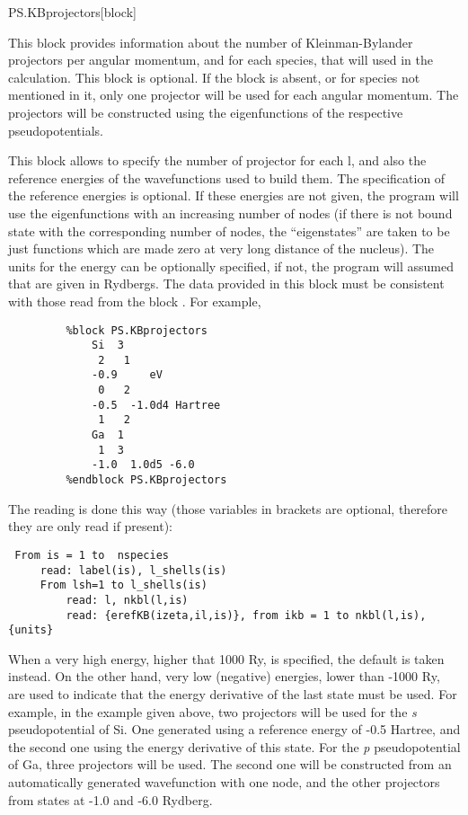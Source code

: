\begin{fdfentry}{PS.KBprojectors}[block]

This block provides information about the number of Kleinman-Bylander
projectors per angular momentum, and for each species, that will used
in the calculation. This block is optional.
If the block is absent, or for species not mentioned in it, only
one projector will be used for each angular momentum. The projectors
will be constructed using the eigenfunctions of the respective
pseudopotentials.


This block allows to specify the number of projector for each l, and also
the reference energies of the wavefunctions used to build them.
The specification of the reference energies is optional. If these
energies are not given, the program will use the eigenfunctions with an
increasing number of nodes (if there is not bound state with
the corresponding number of nodes, the ``eigenstates'' are taken to be just
functions which are made zero at very long distance of the nucleus).
The units for the energy can be optionally specified, if not, the
program will assumed that are given in Rydbergs.
The data provided in this block must be consistent with those
read from the block . For example,

\begin{verbatim}
         %block PS.KBprojectors
             Si  3
              2   1
             -0.9     eV
              0   2
             -0.5  -1.0d4 Hartree
              1   2
             Ga  1
              1  3
             -1.0  1.0d5 -6.0
         %endblock PS.KBprojectors
\end{verbatim}

The reading is done this way (those variables in brackets are optional,
therefore they are only read if
present):

\begin{verbatim}
 From is = 1 to  nspecies
     read: label(is), l_shells(is)
     From lsh=1 to l_shells(is)
         read: l, nkbl(l,is)
         read: {erefKB(izeta,il,is)}, from ikb = 1 to nkbl(l,is), {units}
\end{verbatim}

When a very high energy, higher that 1000 Ry, is specified, the
default is taken instead.  On the other hand, very low (negative)
energies, lower than -1000 Ry, are used to indicate that the energy
derivative of the last state must be used. For example, in the example
given above, two projectors will be used for the \textit{s}
pseudopotential of Si. One generated using a reference energy of -0.5
Hartree, and the second one using the energy derivative of this
state. For the \textit{p} pseudopotential of Ga, three projectors will be
used.  The second one will be constructed from an automatically
generated wavefunction with one node, and the other projectors from
states at -1.0 and -6.0 Rydberg.


\end{fdfentry}
